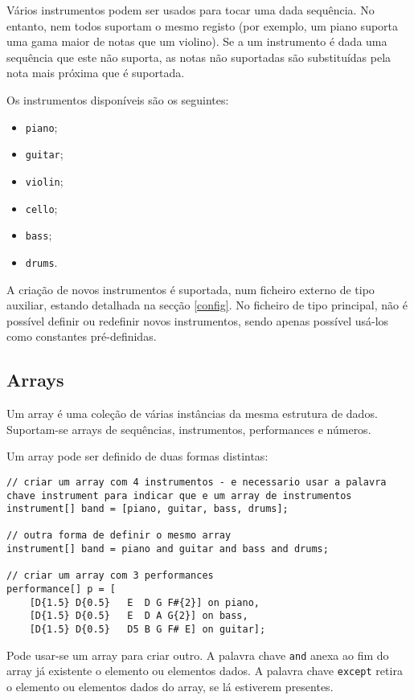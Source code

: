 \documentclass{article}
\begin{document}
Vários instrumentos podem ser usados para tocar uma dada sequência. No entanto, nem todos suportam o mesmo registo (por exemplo, um piano suporta uma gama maior de notas que um violino). Se a um instrumento é dada uma sequência que este não suporta, as notas não suportadas são substituídas pela nota mais próxima que é suportada. %

Os instrumentos disponíveis são os seguintes:
\begin{itemize}
    \item \texttt{piano};
    \item \texttt{guitar};
    \item \texttt{violin};
    \item \texttt{cello};
    \item \texttt{bass};
    \item \texttt{drums}.
\end{itemize}
A criação de novos instrumentos é suportada, num ficheiro externo de tipo auxiliar, estando detalhada na secção \ref{config}. No ficheiro de tipo principal, não é possível definir ou redefinir novos instrumentos, sendo apenas possível usá-los como constantes pré-definidas.

\subsection{Arrays}
Um array é uma coleção de várias instâncias da mesma estrutura de dados. Suportam-se arrays de sequências, instrumentos, performances e números.

Um array pode ser definido de duas formas distintas:
\begin{lstlisting} 
// criar um array com 4 instrumentos - e necessario usar a palavra chave instrument para indicar que e um array de instrumentos
instrument[] band = [piano, guitar, bass, drums];

// outra forma de definir o mesmo array
instrument[] band = piano and guitar and bass and drums;

// criar um array com 3 performances
performance[] p = [
    [D{1.5} D{0.5}   E  D G F#{2}] on piano, 
    [D{1.5} D{0.5}   E  D A G{2}] on bass,
    [D{1.5} D{0.5}   D5 B G F# E] on guitar];
\end{lstlisting} 

Pode usar-se um array para criar outro. A palavra chave \texttt{and} anexa ao fim do array já existente o elemento ou elementos dados.  A palavra chave \texttt{except} retira o elemento ou elementos dados do array, se lá estiverem presentes.
\end{document}
